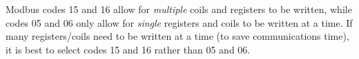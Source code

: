 \vskip 10pt

Modbus codes 15 and 16 allow for {\it multiple} coils and registers to be written, while codes 05 and 06 only allow for {\it single} registers and coils to be written at a time.  If many registers/coils need to be written at a time (to save communications time), it is best to select codes 15 and 16 rather than 05 and 06.



